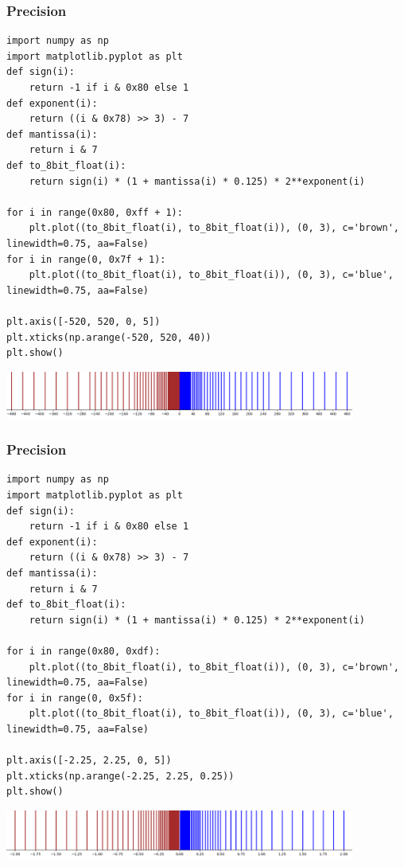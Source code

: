 \documentclass{beamer}
\begin{document}
\begin{frame}[fragile]
\frametitle{Precision}

\tiny

\begin{lstlisting}
import numpy as np
import matplotlib.pyplot as plt
def sign(i):
    return -1 if i & 0x80 else 1
def exponent(i):
    return ((i & 0x78) >> 3) - 7
def mantissa(i):
    return i & 7
def to_8bit_float(i):
    return sign(i) * (1 + mantissa(i) * 0.125) * 2**exponent(i)

for i in range(0x80, 0xff + 1):
    plt.plot((to_8bit_float(i), to_8bit_float(i)), (0, 3), c='brown', linewidth=0.75, aa=False)
for i in range(0, 0x7f + 1):
    plt.plot((to_8bit_float(i), to_8bit_float(i)), (0, 3), c='blue', linewidth=0.75, aa=False)

plt.axis([-520, 520, 0, 5])
plt.xticks(np.arange(-520, 520, 40))
plt.show()
\end{lstlisting}

\begin{center}
  \includegraphics[width=11.5cm]{float_range1.png}
\end{center}


\end{frame}

\begin{frame}[fragile]
\frametitle{Precision}

\tiny

\begin{lstlisting}[linebackgroundcolor={\lstcolorlines{12,13,14,15,16,17,18}}]
import numpy as np
import matplotlib.pyplot as plt
def sign(i):
    return -1 if i & 0x80 else 1
def exponent(i):
    return ((i & 0x78) >> 3) - 7
def mantissa(i):
    return i & 7
def to_8bit_float(i):
    return sign(i) * (1 + mantissa(i) * 0.125) * 2**exponent(i)

for i in range(0x80, 0xdf):
    plt.plot((to_8bit_float(i), to_8bit_float(i)), (0, 3), c='brown', linewidth=0.75, aa=False)
for i in range(0, 0x5f):
    plt.plot((to_8bit_float(i), to_8bit_float(i)), (0, 3), c='blue', linewidth=0.75, aa=False)

plt.axis([-2.25, 2.25, 0, 5])
plt.xticks(np.arange(-2.25, 2.25, 0.25))
plt.show()
\end{lstlisting}

\begin{center}
  \includegraphics[width=11.5cm]{float_range2.png}
\end{center}

\end{frame}
\end{document}
